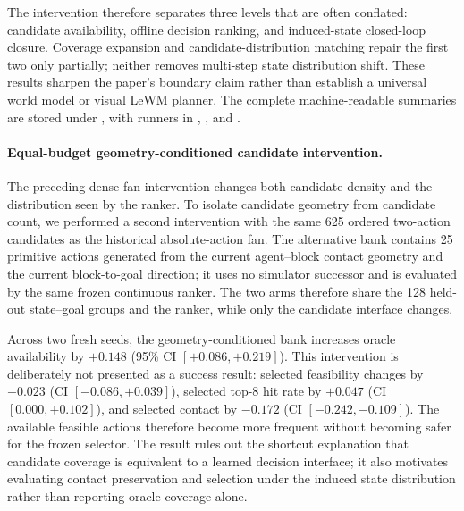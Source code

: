 \documentclass{article}
\begin{document}
The intervention therefore separates three levels that are often conflated:
candidate availability, offline decision ranking, and induced-state
closed-loop closure. Coverage expansion and candidate-distribution matching
repair the first two only partially; neither removes multi-step state
distribution shift. These results sharpen the paper's boundary claim rather
than establish a universal world model or visual LeWM planner. The complete
machine-readable summaries are stored under
, with
runners in
,
, and
.

\paragraph{Equal-budget geometry-conditioned candidate intervention.}
The preceding dense-fan intervention changes both candidate density and the
distribution seen by the ranker. To isolate candidate geometry from candidate
count, we performed a second intervention with the same 625 ordered
two-action candidates as the historical absolute-action fan. The alternative
bank contains 25 primitive actions generated from the current agent--block
contact geometry and the current block-to-goal direction; it uses no simulator
successor and is evaluated by the same frozen continuous ranker. The two arms
therefore share the 128 held-out state--goal groups and the ranker, while only
the candidate interface changes.

Across two fresh seeds, the geometry-conditioned bank increases oracle
availability by $+0.148$ (95\% CI $[+0.086,+0.219]$). This intervention is
deliberately not presented as a success result: selected feasibility changes
by $-0.023$ (CI $[-0.086,+0.039]$), selected top-$8$ hit rate by $+0.047$
(CI $[0.000,+0.102]$), and selected contact by $-0.172$ (CI
$[-0.242,-0.109]$). The available feasible actions therefore become more
frequent without becoming safer for the frozen selector. The result rules out
the shortcut explanation that candidate coverage is equivalent to a learned
decision interface; it also motivates evaluating contact preservation and
selection under the induced state distribution rather than reporting oracle
coverage alone.
\end{document}
